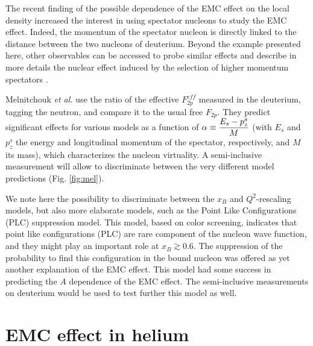 The recent finding of the possible dependence of the EMC effect on the local density increased the interest in using spectator nucleons to study the EMC effect. Indeed, the momentum of the spectator nucleon is directly linked to the distance between the two nucleons of deuterium. Beyond the example presented here, other observables can be accessed to probe similar effects and describe in more details the nuclear effect induced by the selection of higher momentum spectators \cite{frankfurt1988,CiofidegliAtti1999,Melnitchouk1997}.

Melnitchouk {\it et al.} \cite{Melnitchouk1997} use the ratio of the effective $F^{eff}_{2p}$ measured in the deuterium, tagging the neutron, and compare it to the usual free $F_{2p}$. They predict significant effects for various models as a function of $\alpha \equiv \displaystyle{{E_s - p_z^s \over M}}$ (with $E_s$ and  $p_z^s$ the energy and longitudinal momentum of the spectator, respectively, and $M$ its mass), which characterizes the nucleon virtuality.  A semi-inclusive measurement will allow to discriminate between the very different model predictions (Fig. \ref{fig:mel}).

We note here the possibility to discriminate between the $x_B$ and $Q^2$-rescaling models, but also more elaborate models, such as the Point Like Configurations (PLC) suppression model. This model, based on color screening, indicates that point like configurations (PLC) \cite{Frankfurt:1985cv,Melnitchouk1997} are rare component of the nucleon wave function, and they might play an important role at $x_B \gtrsim 0.6$. The suppression of the probability to find this configuration in the bound nucleon was offered as yet another explanation of the EMC effect. This model had some success in predicting the $A$ dependence of the EMC effect. The semi-inclusive measurements on deuterium would be used to test further this model as well.


\section{EMC effect in helium}

